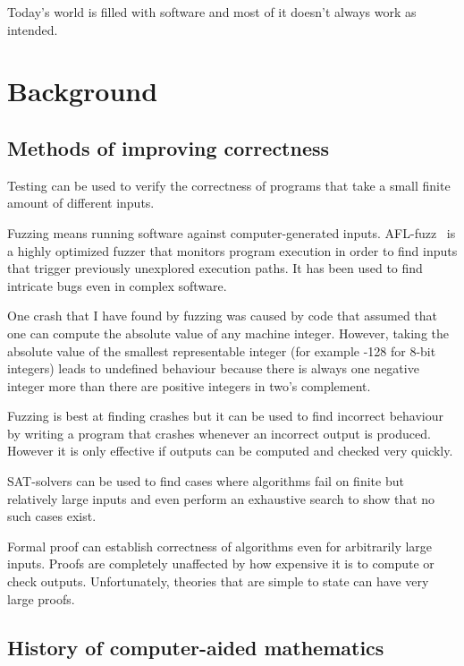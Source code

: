 \documentclass[english, 12pt, a4paper, sci, a-1b, online]{aaltothesis}
\begin{document}
Today's world is filled with software and most of it doesn't always work as intended.

\thispagestyle{empty}

\clearpage
\section{Background}

\subsection{Methods of improving correctness}

Testing can be used to verify the correctness of programs that take a small finite amount of different inputs.

Fuzzing means running software against computer-generated inputs. AFL-fuzz~\cite{AFL} is a highly optimized fuzzer that monitors program execution in order to find inputs that trigger previously unexplored execution paths. It has been used to find intricate bugs even in complex software.

One crash that I have found by fuzzing was caused by code that assumed that one can compute the absolute value of any machine integer. However, taking the absolute value of the smallest representable integer (for example -128 for 8-bit integers) leads to undefined behaviour because there is always one negative integer more than there are positive integers in two's complement.

Fuzzing is best at finding crashes but it can be used to find incorrect behaviour by writing a program that crashes whenever an incorrect output is produced. However it is only effective if outputs can be computed and checked very quickly.

SAT-solvers can be used to find cases where algorithms fail on finite but relatively large inputs and even perform an exhaustive search to show that no such cases exist.

Formal proof can establish correctness of algorithms even for arbitrarily large inputs. Proofs are completely unaffected by how expensive it is to compute or check outputs. Unfortunately, theories that are simple to state can have very large proofs.

\subsection{History of computer-aided mathematics}
\end{document}
